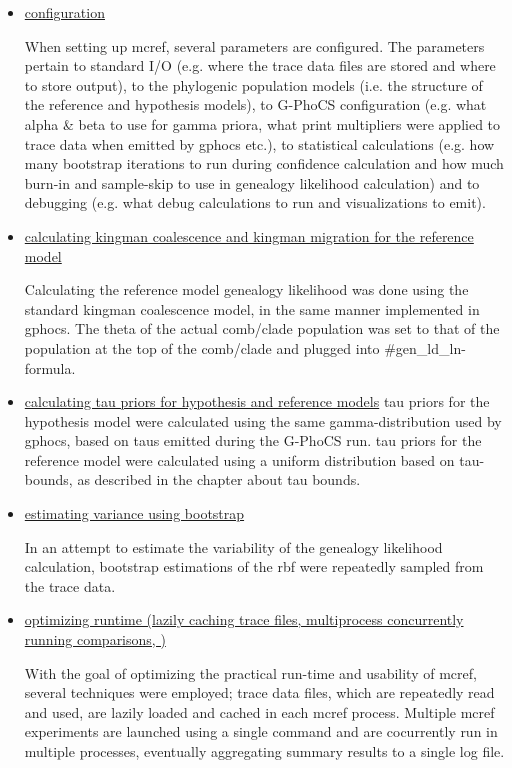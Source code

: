\documentclass[11pt]{article}
\newcommand{\1}{\mathbbm{1}}
\newcommand{\gp}{G-PhoCS }
\begin{document}
\begin{itemize}
\item \underline{configuration}

When setting up mcref, several parameters are configured. The parameters pertain to standard I/O (e.g. where the trace data files are stored and where to store output), to the phylogenic population models (i.e. the structure of the reference and hypothesis models), to \gp configuration (e.g. what alpha \& beta to use for gamma priora, what print multipliers were applied to trace data when emitted by gphocs etc.), to statistical calculations (e.g. how many bootstrap iterations to run during confidence calculation and how much burn-in and sample-skip to use in genealogy likelihood calculation) and to debugging (e.g. what debug calculations to run and visualizations to emit). 

\item \underline{calculating kingman coalescence and kingman migration for the reference model}

Calculating the reference model genealogy likelihood was done using the standard kingman coalescence model, in the same manner implemented in gphocs. The theta of the actual comb/clade population was set to that of the population at the top of the comb/clade and plugged into \#gen\_ld\_ln-formula. 

\item \underline{calculating tau priors for hypothesis and reference models}
tau priors for the hypothesis model were calculated using the same gamma-distribution used by gphocs, based on taus emitted during the \gp run. tau priors for the reference model were calculated using a uniform distribution based on tau-bounds, as described in the chapter about tau bounds.

\item \underline{estimating variance using bootstrap}

In an attempt to estimate the variability of the genealogy likelihood calculation, bootstrap estimations of the rbf were repeatedly sampled from the trace data. 


\item \underline{optimizing runtime (lazily caching trace files, multiprocess concurrently running comparisons, )}

With the goal of optimizing the practical run-time and usability of mcref, several techniques were employed; trace data files, which are repeatedly read and used, are lazily loaded and cached in each mcref process. Multiple mcref experiments are launched using a single command and are cocurrently run in multiple processes, eventually aggregating summary results to a single log file. 


\end{itemize}
\end{document}
